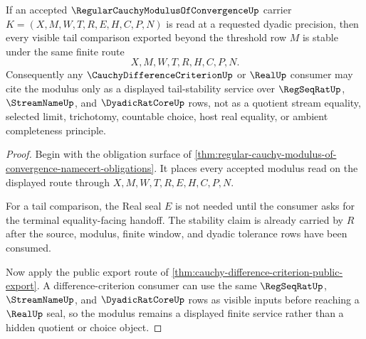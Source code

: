 \begin{theorem}
\label{thm:regular-cauchy-modulus-of-convergence-tail-stability}
If an accepted $\RegularCauchyModulusOfConvergenceUp$ carrier $K=(X,M,W,T,R,E,H,C,P,N)$ is read at a requested dyadic precision, then every visible tail comparison exported beyond the threshold row $M$ is stable under the same finite route
$$
X,M,W,T,R,H,C,P,N .
$$
Consequently any $\CauchyDifferenceCriterionUp$ or $\RealUp$ consumer may cite the modulus only as a displayed tail-stability service over $\RegSeqRatUp$, $\StreamNameUp$, and $\DyadicRatCoreUp$ rows, not as a quotient stream equality, selected limit, trichotomy, countable choice, host real equality, or ambient completeness principle.
\end{theorem}
\begin{proof}
Begin with the obligation surface of \autoref{thm:regular-cauchy-modulus-of-convergence-namecert-obligations}. It places every accepted modulus read on the displayed route through $X,M,W,T,R,E,H,C,P,N$.

For a tail comparison, the Real seal $E$ is not needed until the consumer asks for the terminal equality-facing handoff. The stability claim is already carried by $R$ after the source, modulus, finite window, and dyadic tolerance rows have been consumed.

Now apply the public export route of \autoref{thm:cauchy-difference-criterion-public-export}. A difference-criterion consumer can use the same $\RegSeqRatUp$, $\StreamNameUp$, and $\DyadicRatCoreUp$ rows as visible inputs before reaching a $\RealUp$ seal, so the modulus remains a displayed finite service rather than a hidden quotient or choice object.
\end{proof}



